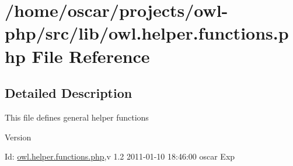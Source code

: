 \section{/home/oscar/projects/owl-\/php/src/lib/owl.helper.functions.php File Reference}
\label{owl_8helper_8functions_8php}


\subsection{Detailed Description}
This file defines general helper functions \begin{DoxyVersion}{Version}

\end{DoxyVersion}
\begin{DoxyParagraph}{Id:}
\hyperlink{owl_8helper_8functions_8php}{owl.helper.functions.php},v 1.2 2011-\/01-\/10 18:46:00 oscar Exp 
\end{DoxyParagraph}

